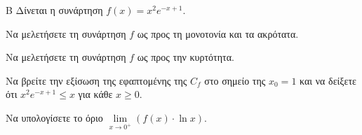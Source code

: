 \begin{thema}{Β}
Δίνεται η συνάρτηση $f(x) = x^2e^{-x+1}$.
\begin{erwthma}
\item Να μελετήσετε τη συνάρτηση $f$ ως προς τη μονοτονία και τα ακρότατα.
\item Να μελετήσετε τη συνάρτηση $f$ ως προς την κυρτότητα.
\item Να βρείτε την εξίσωση της εφαπτομένης της $C_f$ στο σημείο της $x_0 = 1$ και να δείξετε ότι $x^2e^{-x+1} \le x$ για κάθε $x \ge 0$.
\item Να υπολογίσετε το όριο $\lim\limits_{x \to 0^+} (f(x) \cdot \ln x)$.
\end{erwthma}
\end{thema}
